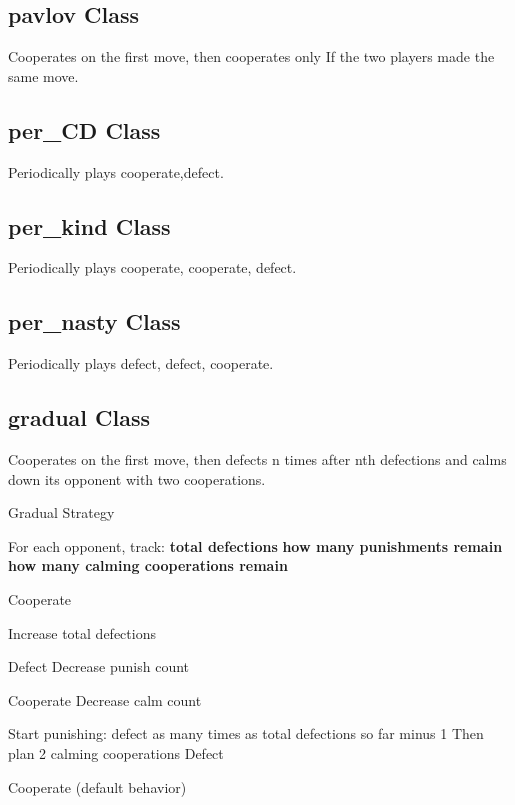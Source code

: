 \documentclass[12pt]{report}
\begin{document}
\subsection{pavlov Class}
Cooperates on the first move, then cooperates only If the two players made the same move.
\subsection{per\_CD Class}
Periodically plays cooperate,defect.
\subsection{per\_kind Class}
Periodically plays cooperate, cooperate, defect.
\subsection{per\_nasty Class}
Periodically plays defect, defect, cooperate.
\subsection{gradual Class}
Cooperates on the first move, then defects n times after nth defections
and calms down its opponent with two cooperations.

\begin{algorithm}
\caption{Gradual Strategy}
\begin{algorithmic}[1]

\State For each opponent, track:
\State \quad \textbf{total defections}
\State \quad \textbf{how many punishments remain}
\State \quad \textbf{how many calming cooperations remain}


    \State Cooperate
    \Return
\EndIf

    \State Increase total defections
\EndIf

    \State Defect
    \State Decrease punish count
    \Return
\EndIf

    \State Cooperate
    \State Decrease calm count
    \Return
\EndIf

    \State Start punishing: defect as many times as total defections so far minus 1
    \State Then plan 2 calming cooperations
    \State Defect
    \Return
\EndIf

\State Cooperate (default behavior)

\EndFunction

\end{algorithmic}
\end{algorithm}
\end{document}
